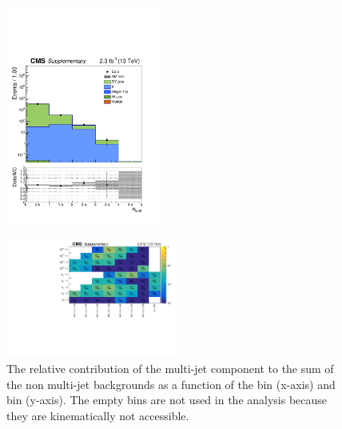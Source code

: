 \begin{figure}[tbhp]
\begin{center}
     \includegraphics[width=0.45\textwidth]{figures/DoubleMu_nBJet40_all_all} \\
  \end{center}
\end{figure}


\clearpage
\begin{figure}[tbhp]
    \caption{ 
    The relative contribution of the multi-jet component to the sum of the non multi-jet backgrounds 
    as a function of the \scalht bin (x-axis) and \nj bin (y-axis). 
    The empty bins are not used in the analysis because they are kinematically not accessible. 
    \label{fig:qcd-rel-cont} }
  \begin{center}
     \includegraphics[width=0.5\textwidth]{figures/QCDRelCont}
  \end{center}
\end{figure}



